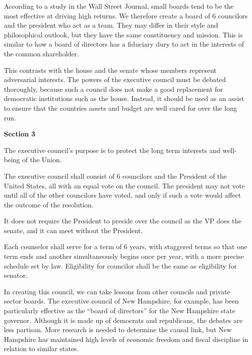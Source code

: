 \documentclass{article}
\begin{document}
According to a study in the Wall Street Journal, small boards tend to be the most effective at driving high returns\cite{Lublin}. We therefore create a board of 6 councilors and the president who act as a team. They may differ in their style and philosophical outlook, but they have the same constituency and mission. This is similar to how a board of directors has a fiduciary dury to act in the interests of the common shareholder.

This contrasts with the house and the senate whose members represent adversarial interests. The powers of the executive council must be debated thoroughly, because such a council does not make a good replacement for democratic institutions such as the house. Instead, it should be used as an assist to ensure that the countries assets and budget are well cared for over the long run.

\begin{quoting}
\textbf{Section 3}

The executive council’s purpose is to protect the long term interests and well-being of the Union.

The executive council shall consist of 6 councilors and the President of the United States, all with an equal vote on the council. The president may not vote until all of the other councilors have voted, and only if such a vote would affect the outcome of the resolution.
\end{quoting}

It does not require the President to preside over the council as the VP does the senate, and it can meet without the President.

\begin{quoting}
Each counselor shall serve for a term of 6 years, with staggered terms so that one term ends and another simultaneously begins once per year, with a more precise schedule set by law. Eligibility for councilor shall be the same as eligibility for senator.
\end{quoting}

In creating this council, we can take lessons from other councils and private sector boards\cite{Khanna}. The executive council of New Hampshire, for example, has been particularly effective as the “board of directors” for the New Hampshire state governor\cite{Hahn-Burkett}. Although it is made up of democrats and republicans, the debates are less partisan\cite{Timmins}. More research is needed to determine the causal link, but New Hampshire has maintained high levels of economic freedom and fiscal discipline in relation to similar states\cite{Ruger}.
\end{document}
